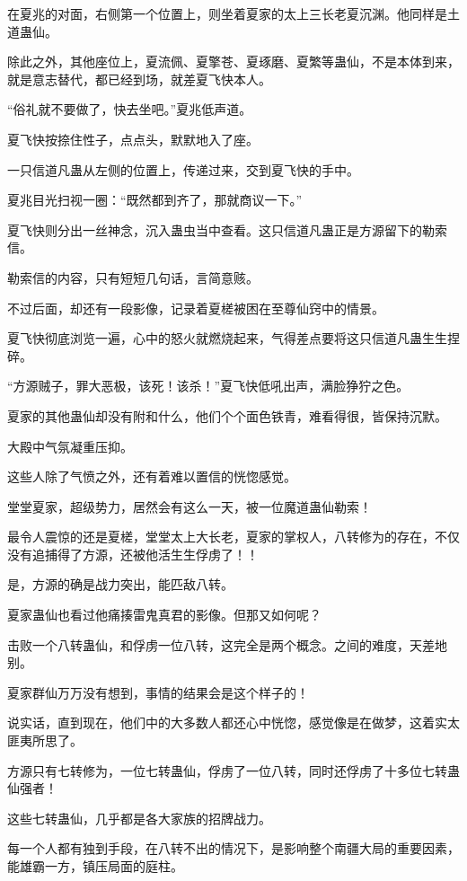 \begin{this_body}
在夏兆的对面，右侧第一个位置上，则坐着夏家的太上三长老夏沉渊。他同样是土道蛊仙。

除此之外，其他座位上，夏流佩、夏擎苍、夏琢磨、夏繁等蛊仙，不是本体到来，就是意志替代，都已经到场，就差夏飞快本人。

“俗礼就不要做了，快去坐吧。”夏兆低声道。

夏飞快按捺住性子，点点头，默默地入了座。

一只信道凡蛊从左侧的位置上，传递过来，交到夏飞快的手中。

夏兆目光扫视一圈：“既然都到齐了，那就商议一下。”

夏飞快则分出一丝神念，沉入蛊虫当中查看。这只信道凡蛊正是方源留下的勒索信。

勒索信的内容，只有短短几句话，言简意赅。

不过后面，却还有一段影像，记录着夏槎被困在至尊仙窍中的情景。

夏飞快彻底浏览一遍，心中的怒火就燃烧起来，气得差点要将这只信道凡蛊生生捏碎。

“方源贼子，罪大恶极，该死！该杀！”夏飞快低吼出声，满脸狰狞之色。

夏家的其他蛊仙却没有附和什么，他们个个面色铁青，难看得很，皆保持沉默。

大殿中气氛凝重压抑。

这些人除了气愤之外，还有着难以置信的恍惚感觉。

堂堂夏家，超级势力，居然会有这么一天，被一位魔道蛊仙勒索！

最令人震惊的还是夏槎，堂堂太上大长老，夏家的掌权人，八转修为的存在，不仅没有追捕得了方源，还被他活生生俘虏了！！

是，方源的确是战力突出，能匹敌八转。

夏家蛊仙也看过他痛揍雷鬼真君的影像。但那又如何呢？

击败一个八转蛊仙，和俘虏一位八转，这完全是两个概念。之间的难度，天差地别。

夏家群仙万万没有想到，事情的结果会是这个样子的！

说实话，直到现在，他们中的大多数人都还心中恍惚，感觉像是在做梦，这着实太匪夷所思了。

方源只有七转修为，一位七转蛊仙，俘虏了一位八转，同时还俘虏了十多位七转蛊仙强者！

这些七转蛊仙，几乎都是各大家族的招牌战力。

每一个人都有独到手段，在八转不出的情况下，是影响整个南疆大局的重要因素，能雄霸一方，镇压局面的庭柱。


\end{this_body}
